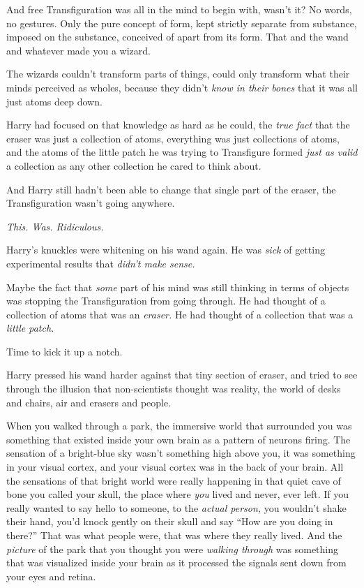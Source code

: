 And free Transfiguration was all in the mind to begin with, wasn’t it? No words, no gestures. Only the pure concept of form, kept strictly separate from substance, imposed on the substance, conceived of apart from its form. That and the wand and whatever made you a wizard.

The wizards couldn’t transform parts of things, could only transform what their minds perceived as wholes, because they didn’t \emph{know in their bones} that it was all just atoms deep down.

Harry had focused on that knowledge as hard as he could, the \emph{true fact} that the eraser was just a collection of atoms, everything was just collections of atoms, and the atoms of the little patch he was trying to Transfigure formed \emph{just as valid} a collection as any other collection he cared to think about.

And Harry still hadn’t been able to change that single part of the eraser, the Transfiguration wasn’t going anywhere.

\emph{This. Was. Ridiculous.}

Harry’s knuckles were whitening on his wand again. He was \emph{sick} of getting experimental results that \emph{didn’t make sense.}

Maybe the fact that \emph{some} part of his mind was still thinking in terms of objects was stopping the Transfiguration from going through. He had thought of a collection of atoms that was an \emph{eraser.} He had thought of a collection that was a \emph{little patch.}

Time to kick it up a notch.

Harry pressed his wand harder against that tiny section of eraser, and tried to see through the illusion that non-scientists thought was reality, the world of desks and chairs, air and erasers and people.

When you walked through a park, the immersive world that surrounded you was something that existed inside your own brain as a pattern of neurons firing. The sensation of a bright-blue sky wasn’t something high above you, it was something in your visual cortex, and your visual cortex was in the back of your brain. All the sensations of that bright world were really happening in that quiet cave of bone you called your skull, the place where \emph{you} lived and never, ever left. If you really wanted to say hello to someone, to the \emph{actual person,} you wouldn’t shake their hand, you’d knock gently on their skull and say “How are you doing in there?” That was what people were, that was where they really lived. And the \emph{picture} of the park that you thought you were \emph{walking through} was something that was visualized inside your brain as it processed the signals sent down from your eyes and retina.


